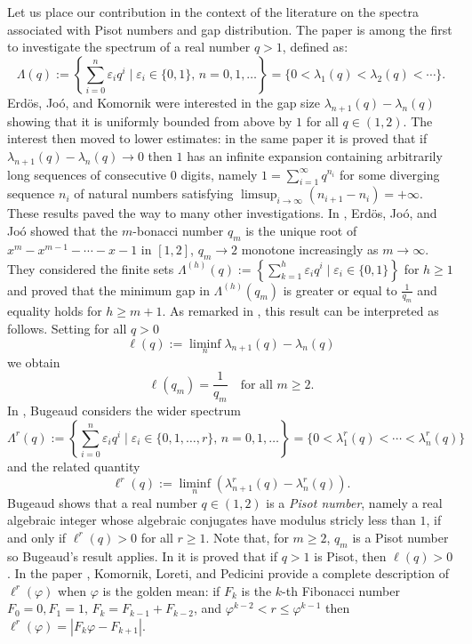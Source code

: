 \documentclass{amsart}
\begin{document}
Let us place our contribution in the context of the literature on the spectra associated with Pisot numbers and gap distribution. 
The paper \cite{EJK90} is among the first to investigate the spectrum of a real number $q>1$, defined as:
$$\Lambda(q):=\left\{\sum_{i=0}^n\varepsilon_iq^i\mid \varepsilon_{i}\in\{0,1\},\, n=0,1,\dots\right\}=\{0<\lambda_1(q)<\lambda_2(q)<\cdots\}.$$
 Erd{\"o}s, Jo{\'o}, and Komornik were interested in the gap size $\lambda_{n+1}(q)-\lambda_n(q)$ showing that it is uniformly bounded from above by $1$ for all $q\in (1,2)$. The interest then moved to lower estimates: in the same paper it is proved that if $\lambda_{n+1}(q)-\lambda_n(q)\to 0$   then $1$ has an infinite expansion containing
arbitrarily long sequences of consecutive $0$ digits, namely $1=\sum_{i=1}^\infty q^{n_i}$ for some diverging sequence $n_i$ of natural numbers satisfying $\limsup_{i\to\infty} (n_{i+1}-n_i)=+\infty$. 
These results paved the way to many other investigations. In \cite{EJ92}, Erd{\"o}s, Jo{\'o}, and Jo{\'o}  showed that the $m$-bonacci number  $q_m$  is the unique root of $x^m-x^{m-1}-\cdots-x-1$ in $[1,2]$, $q_m\to2$ monotone increasingly as $m\to \infty$. They considered 
the finite sets
$\Lambda^{(h)}(q):=\left\{\sum_{k=1}^h \varepsilon_iq^i\mid \varepsilon_i\in\{0,1\}\right\}$
  for $h\geq 1$ and proved that the minimum gap in $\Lambda^{(h)}(q_m)$ is greater or equal to $\frac{1}{q_m}$ and equality holds for $h\geq m+1$.  As remarked in \cite{EJK98}, this result can be interpreted as follows. Setting for all $q>0$
  $$\ell(q):=\liminf_{n} \lambda_{n+1}(q)-\lambda_{n}(q)$$
  we obtain 
  $$\ell(q_m)=\frac{1}{q_m} \quad \text{for all }m\geq 2. $$
  In \cite{bug96}, Bugeaud considers the wider spectrum \begin{equation}\label{genspectrum}\Lambda^r(q):=\left\{\sum_{i=0}^n\varepsilon_iq^i\mid \varepsilon_{i}\in\{0,1,\dots,r\},\, n=0,1,\dots\right\}=\{0<\lambda_1^r(q)<\cdots<\lambda_n^r(q)\}\end{equation}
and the related quantity 
$$\ell^r(q):=\liminf_{n} (\lambda^r_{n+1}(q)-\lambda^r_n(q)).$$
Bugeaud shows that a real number $q\in(1,2)$ is a \emph{Pisot number}, namely a real algebraic integer  whose algebraic conjugates have modulus stricly less than $1$, if and only if $\ell^r(q)>0$ for all $r\geq 1$. Note that, for $m\geq 2$, $q_m$ is a Pisot number so Bugeaud's result applies. In \cite{EJK98} it is  proved that if $q>1$ is Pisot, then $\ell(q)>0$.
In the paper \cite{KLP00}, Komornik, Loreti, and Pedicini provide a complete description of $\ell^r(\varphi)$ when $\varphi$ is the golden mean: if $F_k$ is the $k$-th Fibonacci number $F_0=0,F_1=1,\, F_{k}=F_{k-1}+F_{k-2}$, and $\varphi^{k-2}< r\leq \varphi^{k-1}$ then $\ell^r(\varphi)=|F_{k}\varphi-F_{k+1}|$. 
\end{document}
